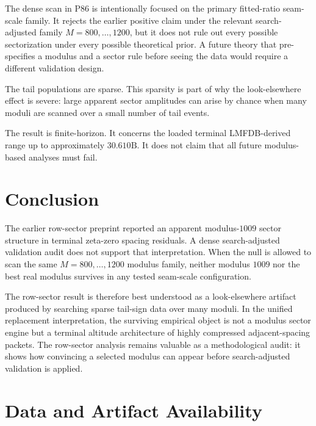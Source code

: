 \documentclass[11pt]{article}
\begin{document}
The dense scan in P86 is intentionally focused on the primary fitted-ratio seam-scale family. It rejects the earlier positive claim under the relevant search-adjusted family \(M=800,\ldots,1200\), but it does not rule out every possible sectorization under every possible theoretical prior. A future theory that pre-specifies a modulus and a sector rule before seeing the data would require a different validation design.

The tail populations are sparse. This sparsity is part of why the look-elsewhere effect is severe: large apparent sector amplitudes can arise by chance when many moduli are scanned over a small number of tail events.

The result is finite-horizon. It concerns the loaded terminal LMFDB-derived range up to approximately \(30.610\mathrm{B}\). It does not claim that all future modulus-based analyses must fail.

\section{Conclusion}

The earlier row-sector preprint reported an apparent modulus-\(1009\) sector structure in terminal zeta-zero spacing residuals. A dense search-adjusted validation audit does not support that interpretation. When the null is allowed to scan the same \(M=800,\ldots,1200\) modulus family, neither modulus \(1009\) nor the best real modulus survives in any tested seam-scale configuration.

The row-sector result is therefore best understood as a look-elsewhere artifact produced by searching sparse tail-sign data over many moduli. In the unified replacement interpretation, the surviving empirical object is not a modulus sector engine but a terminal altitude architecture of highly compressed adjacent-spacing packets. The row-sector analysis remains valuable as a methodological audit: it shows how convincing a selected modulus can appear before search-adjusted validation is applied.

\section*{Data and Artifact Availability}
\end{document}
